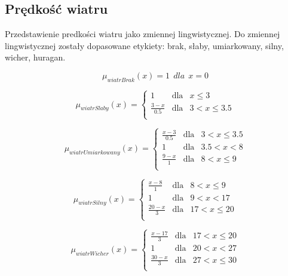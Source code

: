 \documentclass{classrep}
\begin{document}
\subsection{Prędkość wiatru}
Przedstawienie predkości wiatru jako zmiennej lingwistycznej. Do zmiennej lingwistycznej zostały dopasowane etykiety: brak, słaby, umiarkowany, silny, wicher, huragan. 

\begin{equation}
\mu _{wiatrBrak}(x) =   1 \ \ dla \ \ x  = 0
\end{equation}

\begin{equation}
\mu _{wiatrSlaby}(x) =  \left\{ \begin{array}{rcl}
 1 & \mbox{dla} & x  \leq 3 \\
\frac{3- x}{0.5} & \mbox{dla} & 3 < x \leq 3.5\\
\end{array}\right.
\end{equation}

\begin{equation}
\mu _{wiatrUmiarkowany}(x) =  \left\{ \begin{array}{rcl}
\frac{x - 3}{0.5} & \mbox{dla} & 3 < x \leq 3.5\\
1 & \mbox{dla} & 3.5 < x < 8\\
\frac{9 - x}{1} & \mbox{dla} & 8 < x \leq 9\\
\end{array}\right.
\end{equation}

\begin{equation}
\mu _{wiatrSilny}(x) =  \left\{ \begin{array}{rcl}
\frac{x - 8}{1} & \mbox{dla} & 8 < x \leq 9\\
1 & \mbox{dla} & 9 < x < 17\\
\frac{20 - x}{3} & \mbox{dla} & 17 < x \leq 20\\
\end{array}\right.
\end{equation}

\begin{equation}
\mu _{wiatrWicher}(x) =  \left\{ \begin{array}{rcl}
\frac{x - 17}{3} & \mbox{dla} & 17 < x \leq 20\\
1 & \mbox{dla} & 20 < x < 27\\
\frac{30 - x}{3} & \mbox{dla} & 27 < x \leq 30\\
\end{array}\right.
\end{equation}
\end{document}
